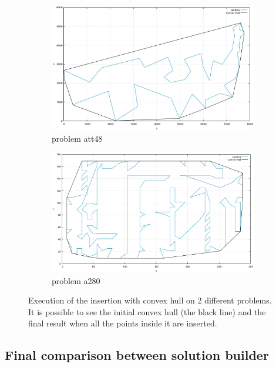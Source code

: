 \begin{figure}[h!]
  \centering
  \begin{subfigure}[b]{0.8\linewidth}
    \includegraphics[width=\linewidth]{media/convex1.jpg}
     \caption{problem att48}
  \end{subfigure}
  \begin{subfigure}[b]{0.8\linewidth}
    \includegraphics[width=\linewidth]{media/convex2.jpg}
    \caption{problem a280}
  \end{subfigure}
  \caption{Execution of the insertion with convex hull on 2 different problems. It is possible to see the initial convex hull (the black line) and the final result when all the points inside it are inserted.}
  \label{fig:insertionHull}
\end{figure}

\subsection{Final comparison between solution builder}

